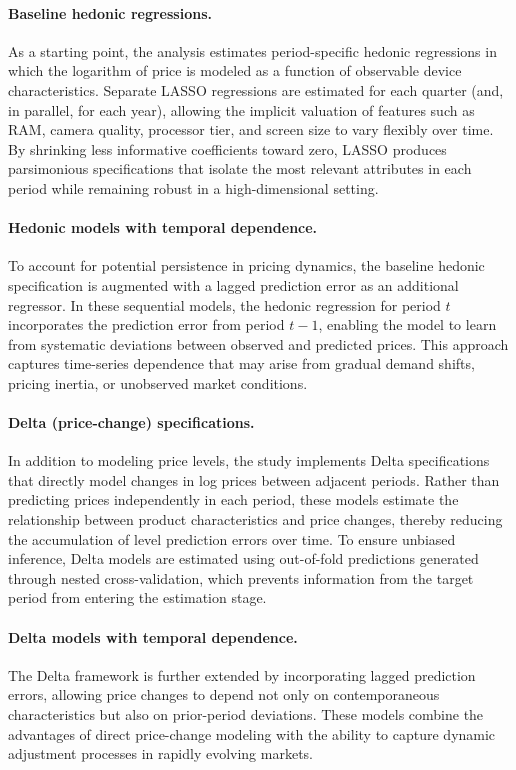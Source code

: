 \documentclass[12pt]{article}
\begin{document}
\paragraph{Baseline hedonic regressions.}
As a starting point, the analysis estimates period-specific hedonic regressions in which the logarithm of price is modeled as a function of observable device characteristics. Separate LASSO regressions are estimated for each quarter (and, in parallel, for each year), allowing the implicit valuation of features such as RAM, camera quality, processor tier, and screen size to vary flexibly over time. By shrinking less informative coefficients toward zero, LASSO produces parsimonious specifications that isolate the most relevant attributes in each period while remaining robust in a high-dimensional setting.

\paragraph{Hedonic models with temporal dependence.}
To account for potential persistence in pricing dynamics, the baseline hedonic specification is augmented with a lagged prediction error as an additional regressor. In these sequential models, the hedonic regression for period $t$ incorporates the prediction error from period $t-1$, enabling the model to learn from systematic deviations between observed and predicted prices. This approach captures time-series dependence that may arise from gradual demand shifts, pricing inertia, or unobserved market conditions.

\paragraph{Delta (price-change) specifications.}
In addition to modeling price levels, the study implements Delta specifications that directly model changes in log prices between adjacent periods. Rather than predicting prices independently in each period, these models estimate the relationship between product characteristics and price changes, thereby reducing the accumulation of level prediction errors over time. To ensure unbiased inference, Delta models are estimated using out-of-fold predictions generated through nested cross-validation, which prevents information from the target period from entering the estimation stage.

\paragraph{Delta models with temporal dependence.}
The Delta framework is further extended by incorporating lagged prediction errors, allowing price changes to depend not only on contemporaneous characteristics but also on prior-period deviations. These models combine the advantages of direct price-change modeling with the ability to capture dynamic adjustment processes in rapidly evolving markets.
\end{document}
